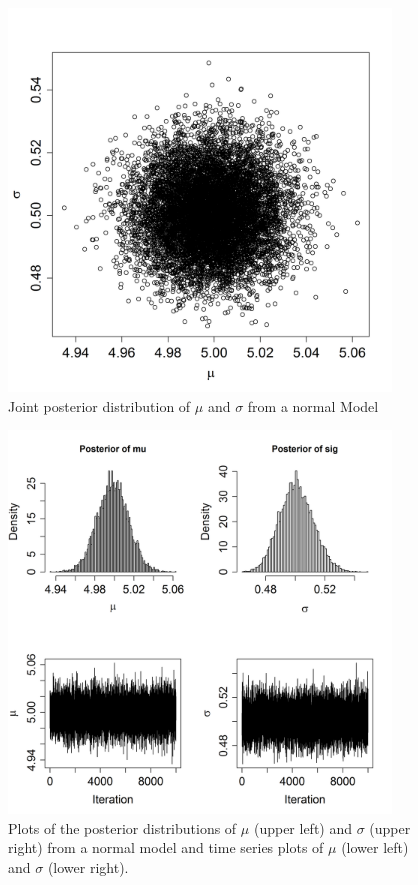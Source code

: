 \begin{figure}[ht]
\begin{center}
\includegraphics[height=4in]{Ch17-MCMC/figs/postdist}
\end{center}
\caption{Joint posterior distribution of $\mu$ and $\sigma$ from a normal Model}
\label{postdist.fig}
\end{figure}

\begin{figure}[ht]
\begin{center}
\includegraphics[width=4in]{Ch17-MCMC/figs/plotsofPD}
\end{center}
\caption{
Plots of the posterior distributions of $\mu$ (upper left) and
  $\sigma$ (upper right)
  from a normal model and time series plots of $\mu$ (lower left) and $\sigma$ (lower right).}
\label{plotsofPD.fig}
\end{figure}


